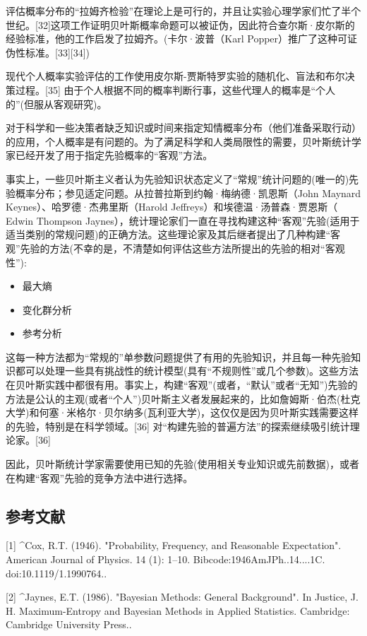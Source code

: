 评估概率分布的“拉姆齐检验”在理论上是可行的，并且让实验心理学家们忙了半个世纪。[32]这项工作证明贝叶斯概率命题可以被证伪，因此符合查尔斯·皮尔斯的经验标准，他的工作启发了拉姆齐。(卡尔·波普（Karl Popper）推广了这种可证伪性标准。[33][34])

现代个人概率实验评估的工作使用皮尔斯-贾斯特罗实验的随机化、盲法和布尔决策过程。[35] 由于个人根据不同的概率判断行事，这些代理人的概率是“个人的”(但服从客观研究)。

对于科学和一些决策者缺乏知识或时间来指定知情概率分布（他们准备采取行动）的应用，个人概率是有问题的。为了满足科学和人类局限性的需要，贝叶斯统计学家已经开发了用于指定先验概率的“客观”方法。

事实上，一些贝叶斯主义者认为先验知识状态定义了“常规”统计问题的(唯一的)先验概率分布；参见适定问题。从拉普拉斯到约翰·梅纳德·凯恩斯（John Maynard Keynes）、哈罗德·杰弗里斯（Harold Jeffreys）和埃德温·汤普森·贾恩斯（ Edwin Thompson Jaynes），统计理论家们一直在寻找构建这种“客观”先验(适用于适当类别的常规问题)的正确方法。这些理论家及其后继者提出了几种构建“客观”先验的方法(不幸的是，不清楚如何评估这些方法所提出的先验的相对“客观性”):

\begin{itemize}
\item 最大熵
\item 变化群分析
\item 参考分析
\end{itemize}

这每一种方法都为“常规的”单参数问题提供了有用的先验知识，并且每一种先验知识都可以处理一些具有挑战性的统计模型(具有“不规则性”或几个参数)。这些方法在贝叶斯实践中都很有用。事实上，构建“客观”(或者，“默认”或者“无知”)先验的方法是公认的主观(或者“个人”)贝叶斯主义者发展起来的，比如詹姆斯·伯杰(杜克大学)和何塞·米格尔·贝尔纳多(瓦利亚大学)，这仅仅是因为贝叶斯实践需要这样的先验，特别是在科学领域。[36] 对“构建先验的普遍方法”的探索继续吸引统计理论家。[36]

因此，贝叶斯统计学家需要使用已知的先验(使用相关专业知识或先前数据)，或者在构建“客观”先验的竞争方法中进行选择。

\subsection{参考文献}

[1]
^Cox, R.T. (1946). "Probability, Frequency, and Reasonable Expectation". American Journal of Physics. 14 (1): 1–10. Bibcode:1946AmJPh..14....1C. doi:10.1119/1.1990764..

[2]
^Jaynes, E.T. (1986). "Bayesian Methods: General Background". In Justice, J. H. Maximum-Entropy and Bayesian Methods in Applied Statistics. Cambridge: Cambridge University Press..

